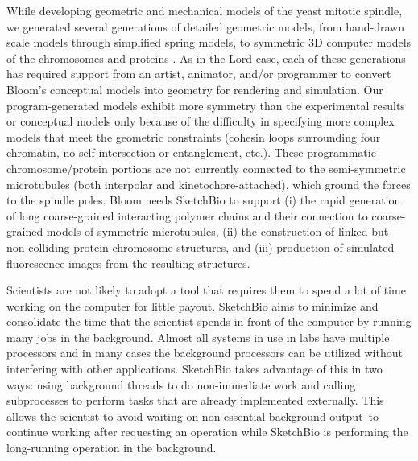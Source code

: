\documentclass{article} %
\begin{document}
While developing geometric and mechanical models of the yeast mitotic spindle, we generated several generations of detailed geometric models, from hand-drawn scale models through simplified spring models, to symmetric 3D computer models of the chromosomes and proteins \cite{taylorBookChapter}.  As in the Lord case, each of these generations has required support from an artist, animator, and/or programmer to convert Bloom's conceptual models into geometry for rendering and simulation.  Our program-generated models exhibit more symmetry than the experimental results or conceptual models only because of the difficulty in specifying more complex models that meet the geometric constraints (cohesin loops surrounding four chromatin, no self-intersection or entanglement, etc.).  These programmatic chromosome/protein portions are not currently connected to the semi-symmetric microtubules (both interpolar and kinetochore-attached), which ground the forces to the spindle poles.  Bloom needs SketchBio to support (i) the rapid generation of long coarse-grained interacting polymer chains and their connection to coarse-grained models of symmetric microtubules, (ii) the construction of linked but non-colliding protein-chromosome structures, and (iii) production of simulated fluorescence images from the resulting structures.

Scientists are not likely to adopt a tool that requires them to spend a lot of time working on the computer for little payout.  SketchBio aims to minimize and consolidate the time that the scientist spends in front of the computer by running many jobs in the background.  Almost all systems in use in labs have multiple processors and in many cases the background processors can be utilized without interfering with other applications.  SketchBio takes advantage of this in two ways: using background threads to do non-immediate work and calling subprocesses to perform tasks that are already implemented externally.  This allows the scientist to avoid waiting on non-essential background output--to continue working after requesting an operation while SketchBio is performing the long-running operation in the background.
\end{document}
